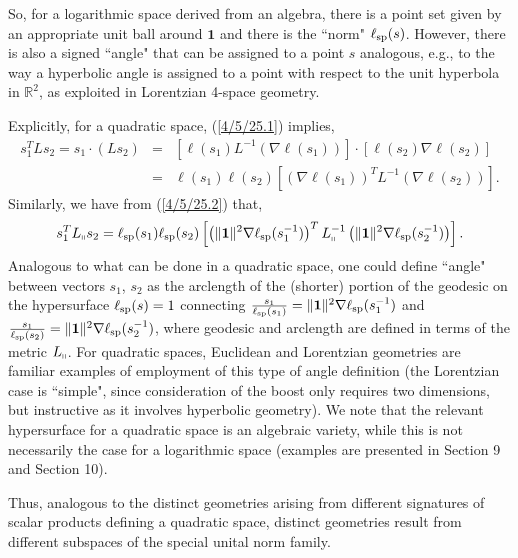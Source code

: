 \documentclass{amsart}
\numberwithin{equation}{section}
\theoremstyle{definition}
\numberwithin{theorem}{section}
\begin{document}
So, for a logarithmic space derived from an algebra, there is a point set given by an appropriate unit ball around $\mathbf{1}$  and there is the ``norm" $\ell_{\rm sp}(s)$.  However, there is also a signed ``angle" that can be assigned to a point $s$ analogous, e.g., to the way a hyperbolic angle is assigned to a point with respect to the unit hyperbola in $\mathbb{R}^2$, as exploited in Lorentzian 4-space geometry.  

Explicitly, for a quadratic space, (\ref{4/5/25.1}) implies,
\begin{eqnarray} \nonumber s_1^TLs_2 = s_1\cdot (Ls_2)  
&=& \left[\ell(s_1) L^{-1} \left(\nabla\ell(s_1)\right)\right] \cdot \left[\ell(s_2)\nabla\ell(s_2)\right] \\  &=& \ell(s_1) \ell(s_2) \left[ \left(\nabla\ell(s_1)\right)^T L^{-1} \left(\nabla\ell(s_2)\right)\right].\label{4/6/25.1}\end{eqnarray} Similarly, we have from (\ref{4/5/25.2}) that, 
\begin{equation}\label{4/6/25.2} s_1^T L_{\shortparallel} s_2 = \ell_{\rm sp} (s_1)\ell_{\rm sp}(s_2) \left[ \left(\|\mathbf{1}\|^2 \nabla\ell_{\rm sp}(s_1^{-1})\right)^T L_{\shortparallel}^{-1} \left(\|\mathbf{1}\|^2\nabla\ell_{\rm sp}(s_2^{-1})\right)\right].\end{equation} 
Analogous to what can be done in a quadratic space, one could define ``angle" between vectors $s_1$, $s_2$ as the arclength of the (shorter) portion of the geodesic on the hypersurface $\ell_{\rm sp}(s)=1$ connecting 
$\frac{s_1}{\ell_{\rm sp}(s_1)} = \|\mathbf{1}\|^2 \nabla\ell_{\rm sp}(s_1^{-1})$ and $\frac{s_1}{\ell_{\rm sp}(s_2)} = \|\mathbf{1}\|^2 \nabla\ell_{\rm sp}(s_2^{-1})$, where geodesic and arclength are defined in terms of the metric $L_{\shortparallel}$.  For quadratic spaces, Euclidean and Lorentzian geometries are familiar examples of employment of this type of angle definition (the Lorentzian case is ``simple", since consideration of the boost only requires two dimensions, but instructive as it involves hyperbolic geometry).
We note that the relevant hypersurface for a quadratic space is an algebraic variety, while this is not necessarily the case for a logarithmic space (examples are presented in Section 9 and Section 10).

Thus, analogous to the distinct geometries arising from different signatures of scalar products defining a quadratic space, distinct geometries result from different subspaces of the special unital norm family.
\end{document}
